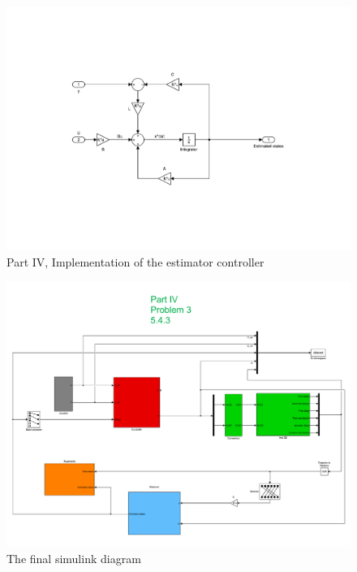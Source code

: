 \begin{figure}[htb]
	\centering
		\includegraphics[width=\textwidth]{models/P4_estimator_control.pdf}
	\caption{Part IV, Implementation of the estimator controller}
\label{fig:P4_observer}
\end{figure}
\begin{figure}[htb]
	\centering
		\includegraphics[width=\textwidth]{models/All_test.pdf}
	\caption{The final simulink diagram}
\label{fig:final_simulink}
\end{figure}

